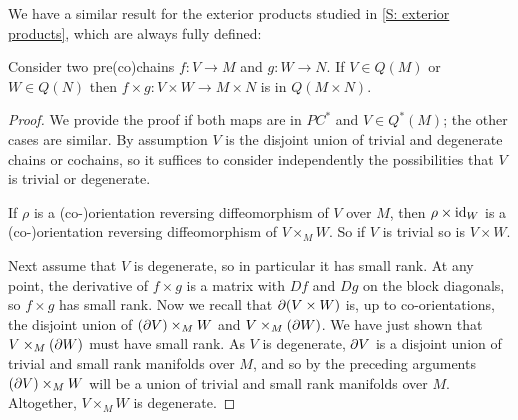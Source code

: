 We have a similar result for the exterior products studied in \cref{S: exterior products}, which are always fully defined:

\begin{lemma}\label{L: exterior Q}
	Consider two pre(co)chains $f \colon V \to M$ and $g \colon W \to N$.
	If $V \in Q(M)$ or $W \in Q(N)$ then $f \times g \colon V \times W \to M \times N$ is in $Q(M \times N)$.
\end{lemma}

\begin{proof}
	We provide the proof if both maps are in $PC^*$ and $V \in Q^*(M)$; the other cases are similar.
	By assumption $V$ is the disjoint union of trivial and degenerate chains or cochains, so it suffices to consider independently the possibilities that $V$ is trivial or degenerate.

	If $\rho$ is a (co-)orientation reversing diffeomorphism of $V$ over $M$, then $\rho \times \mathrm{id}_W$ is a (co-)orientation reversing diffeomorphism of $V \times_M W$.
	So if $V$ is trivial so is $V \times W$.

	Next assume that $V$ is degenerate, so in particular it has small rank.
	At any point, the derivative of $f \times g$ is a matrix with $Df$ and $Dg$ on the block diagonals, so $f \times g$ has small rank.
	Now we recall that $\partial(V \times W)$ is, up to co-orientations, the disjoint union of $(\partial V) \times_M W$ and $V \times_M (\partial W)$.
	We have just shown that $V \times_M (\partial W)$ must have small rank.
	As $V$ is degenerate, $\partial V$ is a disjoint union of trivial and small rank manifolds over $M$, and so by the preceding arguments $(\partial V) \times_M W$ will be a union of trivial and small rank manifolds over $M$.
	Altogether, $V \times_M W$ is degenerate.
\end{proof}

